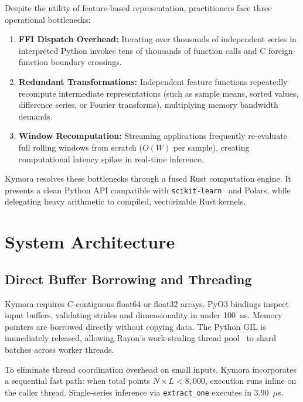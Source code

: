 \documentclass[10pt,twocolumn,letterpaper]{article}
\begin{document}
Despite the utility of feature-based representation, practitioners face three operational bottlenecks:
\begin{enumerate}
    \item \textbf{FFI Dispatch Overhead:} Iterating over thousands of independent series in interpreted Python invokes tens of thousands of function calls and C foreign-function boundary crossings.
    \item \textbf{Redundant Transformations:} Independent feature functions repeatedly recompute intermediate representations (such as sample means, sorted values, difference series, or Fourier transforms), multiplying memory bandwidth demands.
    \item \textbf{Window Recomputation:} Streaming applications frequently re-evaluate full rolling windows from scratch ($O(W)$ per sample), creating computational latency spikes in real-time inference.
\end{enumerate}

Kymora resolves these bottlenecks through a fused Rust computation engine. It presents a clean Python API compatible with \texttt{scikit-learn}~\cite{pedregosa2011scikit} and Polars, while delegating heavy arithmetic to compiled, vectorizable Rust kernels.

\section{System Architecture}
\subsection{Direct Buffer Borrowing and Threading}
Kymora requires $C$-contiguous float64 or float32 arrays. PyO3 bindings inspect input buffers, validating strides and dimensionality in under 100~ns. Memory pointers are borrowed directly without copying data. The Python GIL is immediately released, allowing Rayon's work-stealing thread pool~\cite{rayon} to shard batches across worker threads.

To eliminate thread coordination overhead on small inputs, Kymora incorporates a sequential fast path: when total points $N \times L < 8,000$, execution runs inline on the caller thread. Single-series inference via \texttt{extract\_one} executes in 3.90~$\mu$s.
\end{document}

